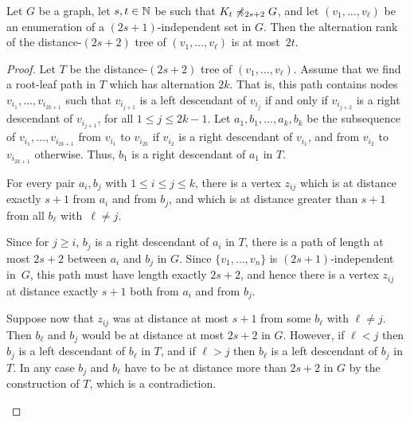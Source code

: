 \begin{lemma}\label{thm:alternation-rank-type-tree}
Let $G$ be a graph, let $s,t\in \mathbb{N}$ be such that $K_t\not\preccurlyeq_{2s+2} G$, and let
$(v_1,\ldots, v_\ell)$ be an enumeration of a $(2s+1)$-independent set 
in $G$. Then the alternation rank of the distance-$(2s+2)$ tree of 
$(v_1,\ldots,v_\ell)$ is at most~$2t$. 
\end{lemma}
\begin{proof}
Let $T$ be the distance-$(2s+2)$ tree of $(v_1,\ldots,v_\ell)$.
Assume that we find a root-leaf path in $T$ which has alternation $2k$.
That is, this path contains nodes $v_{i_1},\ldots, v_{i_{2k+1}}$ such that $v_{i_{j+1}}$ is a left descendant of $v_{i_j}$
if and only if $v_{i_{j+2}}$ is a right descendant of $v_{i_{j+1}}$, for all $1\leq j\leq 2k-1$.
Let $a_1,b_1,\ldots, a_k,b_k$ be the subsequence of $v_{i_1},\ldots, v_{i_{2k+1}}$ from $v_{i_1}$ to $v_{i_{2k}}$ if $v_{i_2}$ is a right descendant of $v_{i_1}$,
and from $v_{i_2}$ to $v_{i_{2k+1}}$ otherwise. Thus, $b_1$ is a right descendant of $a_1$ in $T$.

\begin{claim}\label{cl:zij}
For every pair $a_i,b_j$ with $1\leq i\leq j\leq k$, there
is a vertex $z_{ij}$ which is at distance exactly $s+1$ from 
$a_i$ and from $b_j$, and which is at distance greater than $s+1$ 
from all $b_\ell$ with~$\ell\neq j$. 
\end{claim}
\begin{clproof}
Since for $j\geq i$, $b_j$ is a right descendant of $a_i$ in $T$, 
there is a path of length at most $2s+2$ between $a_i$ and $b_j$ in $G$. 
Since $\{v_1,\ldots, v_n\}$ is $(2s+1)$-independent in~$G$, this path
must have length exactly $2s+2$, and hence there is a vertex $z_{ij}$ 
at distance exactly $s+1$ both from $a_i$ and from $b_j$. 

Suppose now that $z_{ij}$ was at distance at most $s+1$ from some $b_\ell$ with $\ell\neq j$.
Then $b_\ell$ and $b_j$ would be at distance at most $2s+2$ in $G$.
However, if $\ell<j$ then $b_j$ is a left descendant of $b_\ell$ in $T$, and if $\ell>j$ then $b_\ell$ is a left descendant of $b_j$ in $T$.
In any case $b_j$ and $b_\ell$ have to be at distance more than $2s+2$ in $G$ by the construction of $T$, which is a contradiction.
\end{clproof}


\end{proof}
